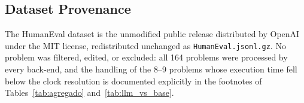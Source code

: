 \documentclass[conference]{IEEEtran}
\begin{document}
\subsection{Dataset Provenance}
The HumanEval dataset \cite{DBLP:journals/corr/abs-2107-03374} is the unmodified public release distributed by OpenAI under the MIT license, redistributed unchanged as \texttt{HumanEval.jsonl.gz}. No problem was filtered, edited, or excluded: all 164 problems were processed by every back-end, and the handling of the 8--9 problems whose execution time fell below the clock resolution is documented explicitly in the footnotes of Tables~\ref{tab:agregado} and~\ref{tab:llm_vs_base}.



\end{document}
